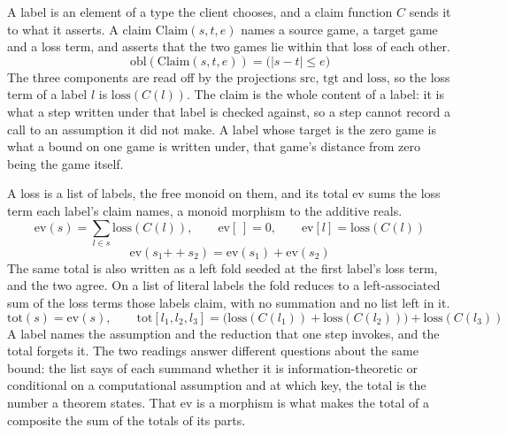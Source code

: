 \begin{definition}
  \label{def:claim}
  \rocqok
  A label is an element of a type the client chooses, and a claim function
  $C$ sends it to what it asserts. A claim $\mathrm{Claim}(s, t, e)$ names a
  source game, a target game and a loss term, and asserts that the two games
  lie within that loss of each other.
  \[ \mathrm{obl}(\mathrm{Claim}(s,t,e))
       = \big(\lvert s - t \rvert \le e\big) \]
  The three components are read off by the projections $\mathrm{src}$,
  $\mathrm{tgt}$ and $\mathrm{loss}$, so the loss term of a label $l$ is
  $\mathrm{loss}(C(l))$. The claim is the whole content of a
  label: it is what a step written under that label is checked against, so a
  step cannot record a call to an assumption it did not make. A label whose
  target is the zero game is what a bound on one game is written under, that
  game's distance from zero being the game itself.
\end{definition}

\begin{definition}
  \label{def:loss}
  \rocqok
  A loss is a list of labels, the free monoid on them, and its total
  $\mathrm{ev}$ sums the loss term each label's claim names, a monoid morphism to
  the additive reals.
  \[ \mathrm{ev}(s) = \sum_{l \in s} \mathrm{loss}(C(l)), \qquad
     \mathrm{ev}[\,] = 0, \qquad \mathrm{ev}[l] = \mathrm{loss}(C(l)) \]
  \[ \mathrm{ev}(s_1 \mathbin{+\!\!+} s_2)
       = \mathrm{ev}(s_1) + \mathrm{ev}(s_2) \]
  The same total is also written as a left fold seeded at the first label's
  loss term, and the two agree. On a list of literal labels the fold reduces to
  a left-associated sum of the loss terms those labels claim, with no summation and
  no list left in it.
  \[ \mathrm{tot}(s) = \mathrm{ev}(s), \qquad
     \mathrm{tot}[l_1, l_2, l_3]
       = \big(\mathrm{loss}(C(l_1)) + \mathrm{loss}(C(l_2))\big)
         + \mathrm{loss}(C(l_3)) \]
  A label names the assumption and the reduction that one step invokes, and the
  total forgets it. The two readings answer different questions about the same
  bound: the list says of each summand whether it is information-theoretic or
  conditional on a computational assumption and at which key, the total is the
  number a theorem states. That $\mathrm{ev}$ is a morphism is what makes the
  total of a composite the sum of the totals of its parts.
\end{definition}

